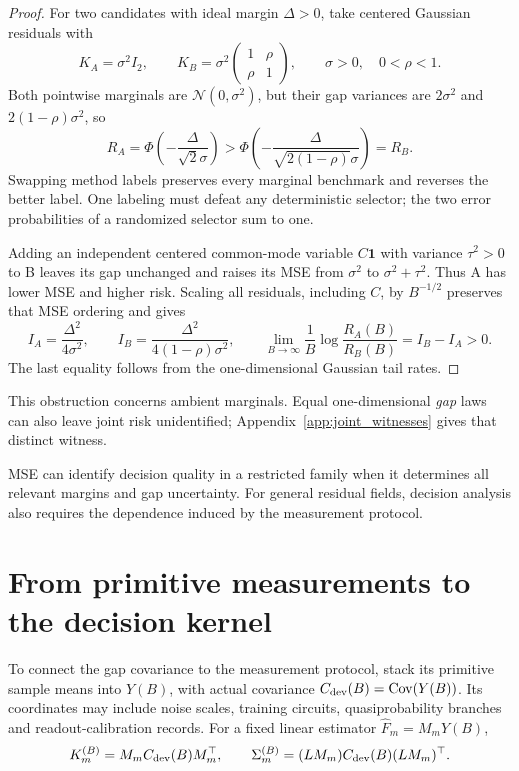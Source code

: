 \documentclass[a4paper,onecolumn,unpublished,nopdfoutputerror]{quantumarticle}
\theoremstyle{plain}
\theoremstyle{definition}
\newcommand{\Cov}{\operatorname{Cov}}
\newcommand{\calN}{\mathcal{N}}
\newcommand{\1}{\mathbf{1}}
\begin{document}
\begin{proof}
For two candidates with ideal margin $\Delta>0$, take centered Gaussian residuals with
\[
K_A=\sigma^2I_2,\qquad
K_B=\sigma^2\begin{pmatrix}1&\rho\\\rho&1\end{pmatrix},\qquad \sigma>0,\quad0<\rho<1.
\]
Both pointwise marginals are $\calN(0,\sigma^2)$, but their gap variances are $2\sigma^2$ and $2(1-\rho)\sigma^2$, so
\begin{equation}
R_A=\Phi\!\left(-\frac{\Delta}{\sqrt2\sigma}\right)
>\Phi\!\left(-\frac{\Delta}{\sqrt{2(1-\rho)}\sigma}\right)=R_B.
\end{equation}
Swapping method labels preserves every marginal benchmark and reverses the better label. One labeling must defeat any deterministic selector; the two error probabilities of a randomized selector sum to one.

Adding an independent centered common-mode variable $C\1$ with variance $\tau^2>0$ to B leaves its gap unchanged and raises its MSE from $\sigma^2$ to $\sigma^2+\tau^2$. Thus A has lower MSE and higher risk. Scaling all residuals, including $C$, by $B^{-1/2}$ preserves that MSE ordering and gives
\begin{equation}
I_A=\frac{\Delta^2}{4\sigma^2},\qquad
I_B=\frac{\Delta^2}{4(1-\rho)\sigma^2},\qquad
\lim_{B\to\infty}\frac1B\log\frac{R_A(B)}{R_B(B)}=I_B-I_A>0.
\end{equation}
The last equality follows from the one-dimensional Gaussian tail rates.
\end{proof}

This obstruction concerns ambient marginals. Equal one-dimensional \emph{gap} laws can also leave joint risk unidentified; Appendix~\ref{app:joint_witnesses} gives that distinct witness.

MSE can identify decision quality in a restricted family when it determines all relevant margins and gap uncertainty. For general residual fields, decision analysis also requires the dependence induced by the measurement protocol.

\section{From primitive measurements to the decision kernel}
\label{sec:primitive_kernel}

To connect the gap covariance to the measurement protocol, stack its primitive sample means into $Y(B)$, with actual covariance $C_{\rm dev}(B)=\Cov(Y(B))$. Its coordinates may include noise scales, training circuits, quasiprobability branches and readout-calibration records. For a fixed linear estimator $\widehat F_m=M_mY(B)$,
\begin{equation}\label{eq:qem_pullback_finite}
K_m^{(B)}=M_mC_{\rm dev}(B)M_m^\top,\qquad
\Sigma_m^{(B)}=(LM_m)C_{\rm dev}(B)(LM_m)^\top.
\end{equation}
\end{document}

